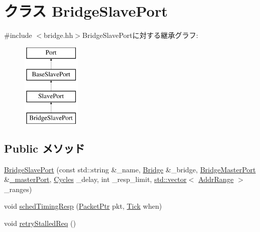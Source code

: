 \hypertarget{classBridge_1_1BridgeSlavePort}{
\section{クラス BridgeSlavePort}
\label{classBridge_1_1BridgeSlavePort}
}


{\ttfamily \#include $<$bridge.hh$>$}BridgeSlavePortに対する継承グラフ:\begin{figure}[H]
\begin{center}
\leavevmode
\includegraphics[height=4cm]{classBridge_1_1BridgeSlavePort}
\end{center}
\end{figure}
\subsection*{Public メソッド}
\begin{DoxyCompactItemize}
\item 
\hyperlink{classBridge_1_1BridgeSlavePort_a2b4ad4cec25b318ebfcf261db753a8fb}{BridgeSlavePort} (const std::string \&\_\-name, \hyperlink{classBridge_1_1Bridge}{Bridge} \&\_\-bridge, \hyperlink{classBridge_1_1BridgeMasterPort}{BridgeMasterPort} \&\hyperlink{classSlavePort_a5e0f39f8e39e5b4c3dcf0991c627489b}{\_\-masterPort}, \hyperlink{classCycles}{Cycles} \_\-delay, int \_\-resp\_\-limit, \hyperlink{classstd_1_1vector}{std::vector}$<$ \hyperlink{classAddrRange}{AddrRange} $>$ \_\-ranges)
\item 
void \hyperlink{classBridge_1_1BridgeSlavePort_a31c2fe79e7cbd7319eb327074e412675}{schedTimingResp} (\hyperlink{classPacket}{PacketPtr} pkt, \hyperlink{base_2types_8hh_a5c8ed81b7d238c9083e1037ba6d61643}{Tick} when)
\item 
void \hyperlink{classBridge_1_1BridgeSlavePort_a7b3f6456ef3aa1b8dcc6d1a20652453d}{retryStalledReq} ()
\end{DoxyCompactItemize}
